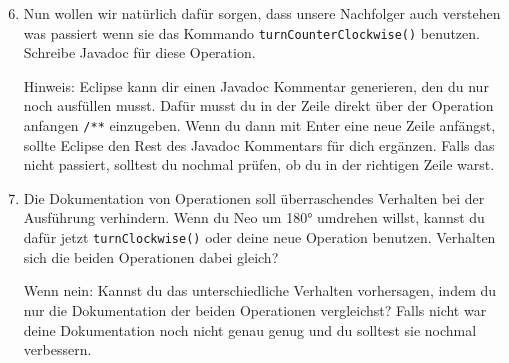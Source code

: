 \begin{enumerate}\setcounter{enumi}{5}
    \item Nun wollen wir natürlich dafür sorgen, dass unsere Nachfolger auch verstehen was passiert wenn sie das Kommando \lstinline{turnCounterClockwise()} benutzen. 
        Schreibe Javadoc für diese Operation.
        
        Hinweis: Eclipse kann dir einen Javadoc Kommentar generieren, den du nur noch ausfüllen musst.
        Dafür musst du in der Zeile direkt über der Operation anfangen \lstinline{/**} einzugeben.
        Wenn du dann mit Enter eine neue Zeile anfängst, sollte Eclipse den Rest des Javadoc Kommentars für dich ergänzen.
        Falls das nicht passiert, solltest du nochmal prüfen, ob du in der richtigen Zeile warst.
    \item Die Dokumentation von Operationen soll überraschendes Verhalten bei der Ausführung verhindern. 
        Wenn du Neo um 180° umdrehen willst, kannst du dafür jetzt \lstinline{turnClockwise()} oder deine neue Operation benutzen. 
        Verhalten sich die beiden Operationen dabei gleich?

        Wenn nein: Kannst du das unterschiedliche Verhalten vorhersagen, indem du nur die Dokumentation der beiden Operationen vergleichst?
        Falls nicht war deine Dokumentation noch nicht genau genug und du solltest sie nochmal verbessern.
\end{enumerate}


